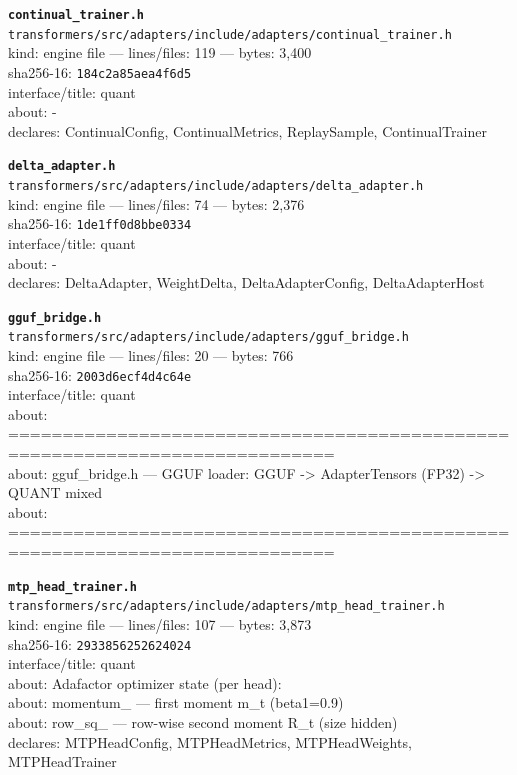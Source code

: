 \noindent\textbf{\texttt{continual\_trainer.h}}\\
\texttt{transformers/src/adapters/include/adapters/continual\_trainer.h}\\
kind: engine file --- lines/files: 119 --- bytes: 3,400\\
sha256-16: \texttt{184c2a85aea4f6d5}\\
interface/title: quant\\
about: -\\
declares: ContinualConfig, ContinualMetrics, ReplaySample, ContinualTrainer\\
\vspace*{6.0pt}

\noindent\textbf{\texttt{delta\_adapter.h}}\\
\texttt{transformers/src/adapters/include/adapters/delta\_adapter.h}\\
kind: engine file --- lines/files: 74 --- bytes: 2,376\\
sha256-16: \texttt{1de1ff0d8bbe0334}\\
interface/title: quant\\
about: -\\
declares: DeltaAdapter, WeightDelta, DeltaAdapterConfig, DeltaAdapterHost\\
\vspace*{6.0pt}

\noindent\textbf{\texttt{gguf\_bridge.h}}\\
\texttt{transformers/src/adapters/include/adapters/gguf\_bridge.h}\\
kind: engine file --- lines/files: 20 --- bytes: 766\\
sha256-16: \texttt{2003d6ecf4d4c64e}\\
interface/title: quant\\
about: ============================================================================\\
about: gguf\_bridge.h — GGUF loader: GGUF -> AdapterTensors (FP32) -> QUANT mixed\\
about: ============================================================================\\
\vspace*{6.0pt}

\noindent\textbf{\texttt{mtp\_head\_trainer.h}}\\
\texttt{transformers/src/adapters/include/adapters/mtp\_head\_trainer.h}\\
kind: engine file --- lines/files: 107 --- bytes: 3,873\\
sha256-16: \texttt{2933856252624024}\\
interface/title: quant\\
about: Adafactor optimizer state (per head):\\
about: momentum\_     — first moment m\_t (beta1=0.9)\\
about: row\_sq\_       — row-wise second moment  R\_t (size hidden)\\
declares: MTPHeadConfig, MTPHeadMetrics, MTPHeadWeights, MTPHeadTrainer\\
\vspace*{6.0pt}
\newpage

